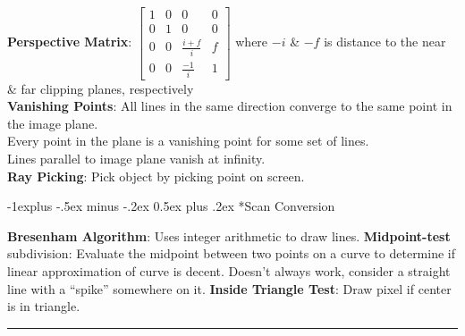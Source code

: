 \documentclass[3pt,landscape]{article}
\makeatletter
\renewcommand{\subsection}{\@startsection{subsection}{2}{0mm}%
                            {-1explus -.5ex minus -.2ex}%
                            {0.5ex plus .2ex}%
                            {\normalfont\normalsize\bfseries}}
\makeatother
\begin{document}
\begin{multicols}{3}
{\bf Perspective Matrix}: \(\begin{bmatrix}
1 & 0 & 0 & 0 \\
0 & 1 & 0 & 0 \\
0 & 0 & \frac{i+f}{i} & f \\
0 & 0 & \frac{-1}{i} & 1
\end{bmatrix}\) where \(-i\) \& \(-f\) is distance to the near \& far clipping planes, respectively\\
{\bf Vanishing Points}: All lines in the same direction converge to the same point in the image plane.\\
Every point in the plane is a vanishing point for some set of lines.\\
Lines parallel to image plane vanish at infinity.\\
{\bf Ray Picking}: Pick object by picking point on screen.


\subsection*{Scan Conversion}

{\bf Bresenham Algorithm}: Uses integer arithmetic to draw lines.
{\bf Midpoint-test} subdivision: Evaluate the midpoint between two points on a curve to determine if linear approximation of curve is decent. Doesn't always work, consider a straight line with a ``spike'' somewhere on it.
{\bf Inside Triangle Test}: Draw pixel if center is in triangle.


\rule{0.3\linewidth}{0.25pt}
\newpage
\scriptsize


\end{multicols}
\end{document}
